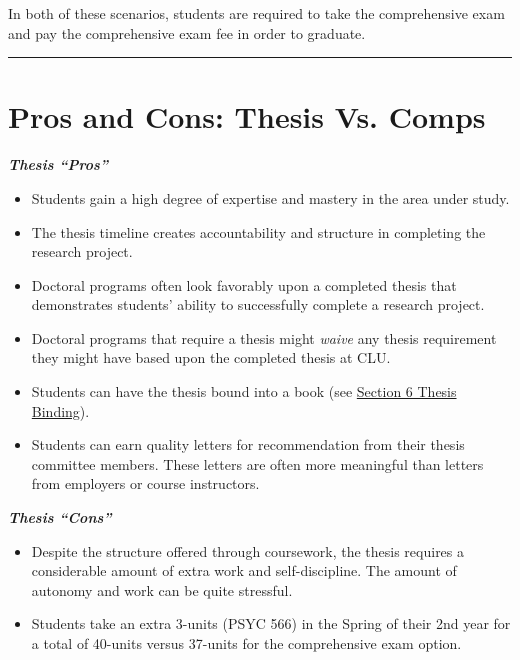\documentclass[
  openany]{book}
\providecommand{\tightlist}{%
  \setlength{\itemsep}{0pt}\setlength{\parskip}{0pt}}
\begin{document}
In both of these scenarios, students are required to take the comprehensive exam and pay the comprehensive exam fee in order to graduate.

\begin{center}\rule{0.5\linewidth}{0.5pt}\end{center}

\hypertarget{pros-and-cons-thesis-vs.-comps}{%
\section{Pros and Cons: Thesis Vs. Comps}\label{pros-and-cons-thesis-vs.-comps}}

\textbf{\emph{Thesis ``Pros''}}

\begin{itemize}
\tightlist
\item
  Students gain a high degree of expertise and mastery in the area under study.
\item
  The thesis timeline creates accountability and structure in completing the research project.
\item
  Doctoral programs often look favorably upon a completed thesis that demonstrates students' ability to successfully complete a research project.
\item
  Doctoral programs that require a thesis might \emph{waive} any thesis requirement they might have based upon the completed thesis at CLU.
\item
  Students can have the thesis bound into a book (see \protect\hyperlink{binding}{Section 6 Thesis Binding}).
\item
  Students can earn quality letters for recommendation from their thesis committee members. These letters are often more meaningful than letters from employers or course instructors.
\end{itemize}

\textbf{\emph{Thesis ``Cons''}}

\begin{itemize}
\tightlist
\item
  Despite the structure offered through coursework, the thesis requires a considerable amount of extra work and self-discipline. The amount of autonomy and work can be quite stressful.
\item
  Students take an extra 3-units (PSYC 566) in the Spring of their 2nd year for a total of 40-units versus 37-units for the comprehensive exam option.
\end{itemize}
\end{document}
